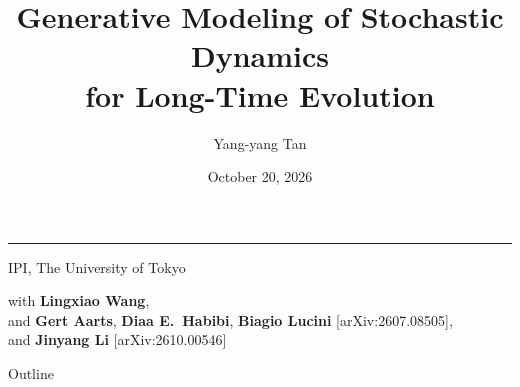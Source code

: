 \documentclass[11pt,t]{beamer}
\title{Generative Modeling of Stochastic Dynamics\\ for Long-Time Evolution}
\subtitle{}
\date{October 20, 2026}
\author{Yang-yang Tan}
\begin{document}
\begin{frame}
  \inserttitlegraphic\par
  \vspace*{0.5cm}
  {\Large\bfseries \inserttitle\par}
  \vspace{0.4em}
  {\color{orange}\rule{\textwidth}{0.4pt}\par}
  \vspace{1.4em}
  {\normalsize\bfseries \insertauthor\par}
  \vspace{0.6em}
  {\small IPI, The University of Tokyo\par}
  \vspace{0.4em}
  {\small with \textbf{Lingxiao Wang},\\
  and \textbf{Gert Aarts}, \textbf{Diaa E.\ Habibi}, \textbf{Biagio Lucini} [arXiv:2607.08505],\\
  and \textbf{Jinyang Li} [arXiv:2610.00546]\par}
  \vspace{0.3em}
  {\normalsize \insertdate\par}
\end{frame}

\begin{frame}{Outline}
  \tableofcontents
\end{frame}

\end{document}

